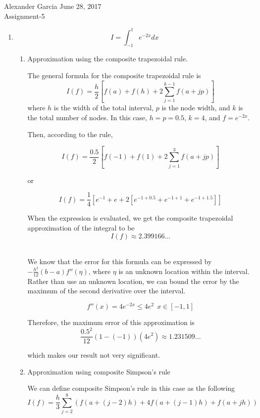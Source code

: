 \documentclass[11pt]{article}
\begin{document}
\lstset{stringstyle=\ttfamily,
	showstringspaces=false,
	basicstyle=\small}

\begin{center} Alexander Garcia \hfill June 28, 2017 \\ Assignment-5 \end{center}

\medskip

\begin{enumerate}

	\item $$I = \int_{-1}^{1}e^{-2x} dx$$

	\begin{enumerate}

		\item Approximation using the composite trapezoidal rule.

		The general formula for the composite trapezoidal rule is
		\[
		I(f) = \frac{h}{2}[f(a)+f(h)+2\sum_{j=1}^{k-1}f(a+jp)]
		\]
		where $h$ is the width of the total interval, $p$ is the node width, and $k$ is the total number of nodes. In this case, $h=p = 0.5$, $k=4$, and $f = e^{-2x}$.

		Then, according to the rule,

		\[
		I(f) = \frac{0.5}{2}[f(-1) + f(1) + 2\sum_{j=1}^{3}f(a+jp)]
		\]

		or

		\[
		I(f) = \frac{1}{4}[e^{-1} + e + 2[e^{-1+0.5} + e^{-1+1} + e^{-1+1.5}]]
		\]

		When the expression is evaluated, we get the composite trapezoidal approximation of the integral to be
		\[
		I(f) \approx 2.399166\ldots
		\] \

		We know that the error for this formula can be expressed by $-\frac{h^2}{12}(b-a)f''(\eta)$, where $\eta$ is an unknown location within the interval. Rather than use an unknown location, we can bound the error by the maximum of the second derivative over the interval.

		\[f''(x) = 4e^{-2x} \leq 4e^2\ \ x\in[-1,1]\]

		Therefore, the maximum error of this approximation is
		\[
		\frac{0.5^2}{12}(1-(-1))(4e^2) \approx 1.231509\ldots
		\]

		which makes our result not very significant.

		\medskip

		\item Approximation using composite Simpson's rule

		We can define composite Simpson's rule in this case as the following
		\[
		I(f) = \frac{h}{3}\sum_{j=2}^{8}(f(a+(j-2)h) + 4f(a+(j-1)h) + f(a+jh))
		\]


\end{enumerate}
\end{enumerate}
\end{document}
